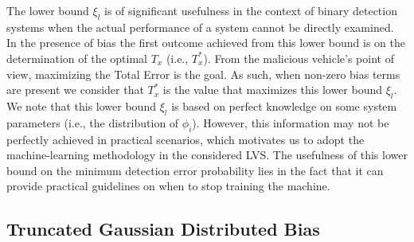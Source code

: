 \documentclass[journal]{IEEEtran}
\begin{document}
The lower bound $\xi_l$ is of significant usefulness in the context of binary detection systems when the actual  performance of a system cannot be directly examined. In the presence of bias the first outcome achieved from this lower bound is on the determination of the optimal $T_x$ (i.e., $T_x^{\ast}$). From the malicious vehicle's point of view,  maximizing the Total Error is the goal. As such, when non-zero bias terms are present we consider that $T_x^{\ast}$ is the value that maximizes this lower bound $\xi_l$. We note that this lower bound $\xi_l$ is based on  perfect knowledge on some system parameters (i.e., the distribution of $\phi_i$). However, this information may not be perfectly achieved in practical scenarios, which motivates us to adopt the machine-learning methodology in the considered LVS. The usefulness of this lower bound on the minimum detection error probability lies in the fact that it can provide practical guidelines on when to stop training the machine.

\subsection{Truncated Gaussian Distributed Bias}
\end{document}

